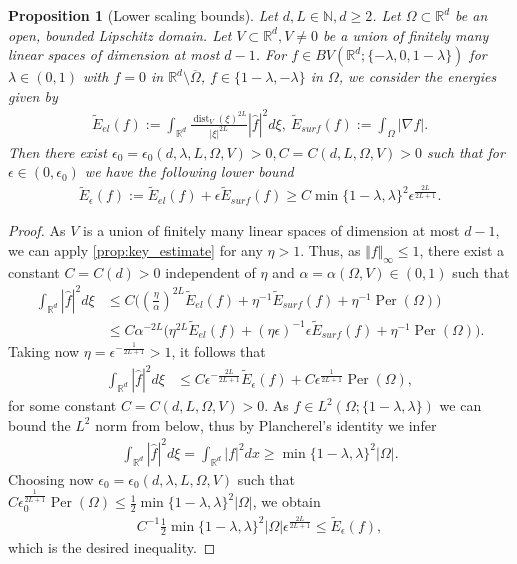 \documentclass[a4paper, 10pt, twoside, notitlepage]{amsart}
\theoremstyle{plain}
\newtheorem{prop}{Proposition}[section]
\newcommand{\R}{\mathbb{R}}
\newcommand{\N}{\mathbb{N}}
\DeclareMathOperator{\dist}{dist}
\DeclareMathOperator{\Per}{Per}
\begin{document}
			\begin{prop}[Lower scaling bounds] 
			\label{thm:LowerScalingUnionVS} 
			Let $d,L \in \N, d \geq 2$. Let $\Omega \subset \R^d$ be an open, bounded Lipschitz domain.  Let $V \subset \R^d, V \neq 0$ be a union of
				finitely many linear spaces of dimension at most $d-1$.  For $f \in BV(\R^d;\{-\lambda,0,1-\lambda\})$ for $\lambda \in (0,1)$ with $f = 0$ in $\R^d \setminus \overline{ \Omega}$, $f \in \{1-\lambda,-\lambda\}$ in $\Omega$, we consider the energies given by
				\begin{align*}
					\tilde{E}_{el}(f) := \int_{\R^d} \frac{\dist_V(\xi)^{2L}}{|\xi|^{2L}} |\hat{f}|^2 d\xi, \ \tilde{E}_{surf}(f) := \int_{\Omega} |\nabla f|.
				\end{align*}
				Then there exist $\epsilon_0 = \epsilon_0(d,\lambda,L,\Omega, V) > 0, C = C(d,L,\Omega, V) > 0$ such that for $\epsilon \in (0,\epsilon_0)$ we have the following lower bound
				\begin{align*}
					\tilde{E}_{\epsilon}(f) := \tilde{E}_{el}(f) + \epsilon \tilde{E}_{surf}(f) \geq C \min\{1-\lambda,\lambda\}^2 \epsilon^{\frac{2L}{2L+1}}.
				\end{align*}
			\end{prop}
    			\begin{proof}
				As $V$ is a union of finitely many linear spaces of dimension at most $d-1$, we can apply \cref{prop:key_estimate} for any $\eta >1$. Thus, as $\Vert f \Vert_\infty \leq 1$, there exist a constant $C = C(d)>0$
				independent of $\eta$ and $\alpha = \alpha(\Omega,V) \in (0,1)$ such that
				\begin{align*}
					\int_{\R^d} |\hat{f}|^2 d\xi & \leq C \Big( \left(\frac{\eta}{\alpha}\right)^{2L} \tilde{E}_{el}(f) + \eta^{-1} \tilde{E}_{surf}(f) + \eta^{-1} \Per(\Omega) \Big) \\
					& \leq C \alpha^{-2L} \Big( \eta^{2L} \tilde{E}_{el}(f) + (\eta \epsilon)^{-1} \epsilon \tilde{E}_{surf}(f) + \eta^{-1} \Per(\Omega) \Big).
				\end{align*}
				Taking now $\eta = \epsilon^{-\frac{1}{2L+1}} >1$, it follows that
				\begin{align*}
					\int_{\R^d} |\hat{f}|^2 d\xi & \leq C \epsilon^{-\frac{2L}{2L+1}} \tilde{E}_\epsilon(f) + C \epsilon^{\frac{1}{2L+1}} \Per(\Omega),
				\end{align*}
				for some constant $C = C(d,L,\Omega,V)>0$.
				As $f \in L^2(\Omega;\{1-\lambda,\lambda\})$ we can bound the $L^2$ norm from below, thus by Plancherel's identity we infer
				\begin{align*}
					\int_{\R^d} |\hat{f}|^2 d\xi = \int_{\R^d} |f|^2 dx \geq \min\{1-\lambda,\lambda\}^2 |\Omega|.
				\end{align*}
				Choosing now $\epsilon_0 = \epsilon_0(d,\lambda,L, \Omega, V)$ such that $C \epsilon_0^{\frac{1}{2L+1}} \Per(\Omega) \leq \frac{1}{2} \min\{1-\lambda,\lambda\}^2 |\Omega|$, we obtain
				\begin{align*}
					C^{-1} \frac{1}{2} \min\{1-\lambda,\lambda\}^2 |\Omega|  \epsilon^{\frac{2L}{2L+1}} \leq \tilde{E}_\epsilon(f),
				\end{align*}
				which is the desired inequality.
                              \end{proof}
\end{document}
